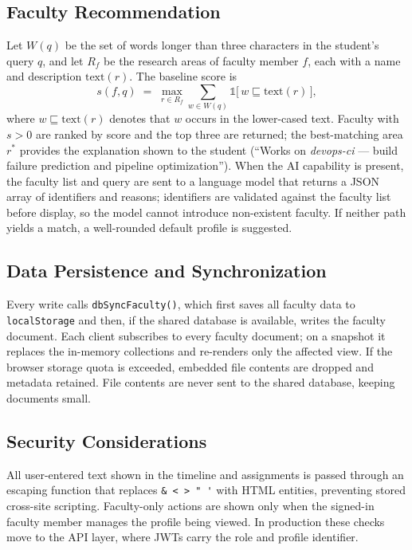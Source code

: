 \documentclass[conference]{IEEEtran}
\begin{document}
\subsection{Faculty Recommendation}
Let $W(q)$ be the set of words longer than three characters in the student's query $q$, and let $R_f$ be the research areas of faculty member $f$, each with a name and description $\mathrm{text}(r)$. The baseline score is
\begin{equation}
s(f,q) \;=\; \max_{r\in R_f} \sum_{w\in W(q)} \mathbb{1}\big[\,w \sqsubseteq \mathrm{text}(r)\,\big],
\end{equation}
where $w \sqsubseteq \mathrm{text}(r)$ denotes that $w$ occurs in the lower-cased text. Faculty with $s>0$ are ranked by score and the top three are returned; the best-matching area $r^{*}$ provides the explanation shown to the student (``Works on \emph{devops-ci} --- build failure prediction and pipeline optimization''). When the AI capability is present, the faculty list and query are sent to a language model that returns a JSON array of identifiers and reasons; identifiers are validated against the faculty list before display, so the model cannot introduce non-existent faculty. If neither path yields a match, a well-rounded default profile is suggested.

\subsection{Data Persistence and Synchronization}
Every write calls \texttt{dbSyncFaculty()}, which first saves all faculty data to \texttt{localStorage} and then, if the shared database is available, writes the faculty document. Each client subscribes to every faculty document; on a snapshot it replaces the in-memory collections and re-renders only the affected view. If the browser storage quota is exceeded, embedded file contents are dropped and metadata retained. File contents are never sent to the shared database, keeping documents small.

\subsection{Security Considerations}
All user-entered text shown in the timeline and assignments is passed through an escaping function that replaces \verb|& < > " '| with HTML entities, preventing stored cross-site scripting. Faculty-only actions are shown only when the signed-in faculty member manages the profile being viewed. In production these checks move to the API layer, where JWTs carry the role and profile identifier.
\end{document}
